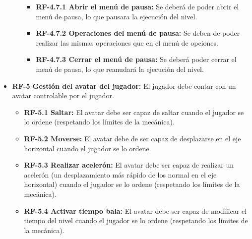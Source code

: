 \begin{itemize}
\begin{itemize}
\begin{itemize}
\item
\textbf{RF-4.7.1 Abrir el menú de pausa:} Se deberá de poder abrir el menú de pausa, lo que pausara la ejecución del nivel.
\end{itemize}

\begin{itemize}
\item
\textbf{RF-4.7.2 Operaciones del menú de pausa:} Se deben de poder realizar las mismas operaciones que en el menú de opciones.
\end{itemize}

\begin{itemize}
\item
\textbf{RF-4.7.3 Cerrar el menú de pausa:} Se deberá poder cerrar el menú de pausa, lo que reanudará la ejecución del nivel.
\end{itemize}
\end{itemize}

\item
\textbf{RF-5 Gestión del avatar del jugador:} El jugador debe contar con un avatar controlable por el jugador.

\begin{itemize}
\item
\textbf{RF-5.1 Saltar:} El avatar debe ser capaz de saltar cuando el jugador se lo ordene (respetando los límites de la mecánica).
\end{itemize}

\begin{itemize}
\item
\textbf{RF-5.2 Moverse:} El avatar debe de ser capaz de desplazarse en el eje horizontal cuando el jugador se lo ordene.
\end{itemize}

\begin{itemize}
\item
\textbf{RF-5.3 Realizar acelerón:} El avatar debe ser capaz de realizar un acelerón (un desplazamiento más rápido de los normal en el eje horizontal) cuando el jugador se lo ordene (respetando los límites de la mecánica).
\end{itemize}

\begin{itemize}
\item
\textbf{RF-5.4 Activar tiempo bala:} El avatar debe ser capaz de modificar el tiempo del nivel cuando el jugador se lo ordene (respetando los límites de la mecánica).
\end{itemize}


\end{itemize}
